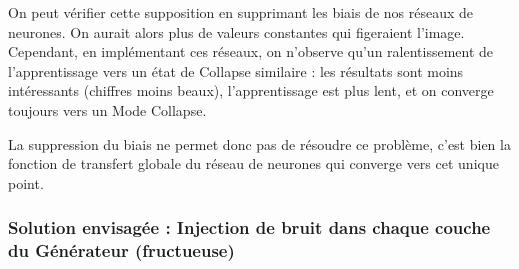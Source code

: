 On peut vérifier cette supposition en supprimant les biais de nos réseaux de neurones. On aurait alors plus de valeurs constantes qui figeraient l'image. Cependant, en implémentant ces réseaux, on n'observe qu'un ralentissement de l'apprentissage vers un état de Collapse similaire : les résultats sont moins intéressants (chiffres moins beaux), l'apprentissage est plus lent, et on converge toujours vers un Mode Collapse.

La suppression du biais ne permet donc pas de résoudre ce problème, c'est bien la fonction de transfert globale du réseau de neurones qui converge vers cet unique point.  


\subsubsection{Solution envisagée : Injection de bruit dans chaque couche du Générateur (fructueuse)}
